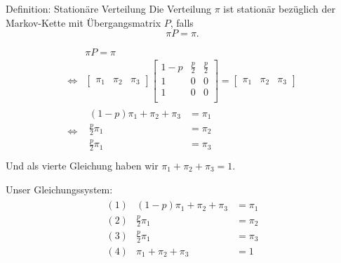 \documentclass[t,11pt]{beamer}
\begin{document}
\begin{frame}
\begin{alertblock}{Definition: Stationäre Verteilung}
	Die Verteilung $\pi$ ist stationär bezüglich der Markov-Kette mit Übergangsmatrix $P$, falls $$\pi P = \pi.$$
\end{alertblock}
\begin{align*}
&\pi P = \pi \\
\Longleftrightarrow & \begin{bmatrix}
\pi_1 & \pi_2 & \pi_3 
\end{bmatrix} \begin{bmatrix}
1-p & \frac{p}{2} & \frac{p}{2} \\
1 & 0 & 0 \\
1 & 0 & 0 \\
\end{bmatrix} = \begin{bmatrix}
\pi_1 & \pi_2 & \pi_3 
\end{bmatrix} \\
\Longleftrightarrow
&\begin{matrix}
(1-p) \pi_1 + \pi_2 + \pi_3 &= \pi_1 \\
\frac{p}{2}\pi_1 &= \pi_2 \\
\frac{p}{2}\pi_1 &= \pi_3 \\
\end{matrix}
\end{align*}
Und als vierte Gleichung haben wir $\pi_1+\pi_2+\pi_3 = 1.$
\end{frame}

\begin{frame}
	Unser Gleichungssystem:
	\begin{align*}
		\begin{matrix}
		(1) & (1-p) \pi_1 + \pi_2 + \pi_3 &= \pi_1 \\
		(2) & \frac{p}{2}\pi_1 &= \pi_2 \\
		(3) & \frac{p}{2}\pi_1 &= \pi_3 \\
		(4) & \pi_1+\pi_2+\pi_3 &= 1 \\
		\end{matrix}
	\end{align*}
\end{frame}
\end{document}
